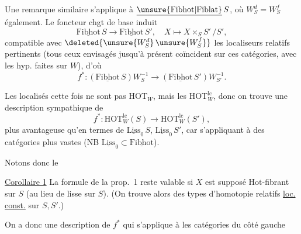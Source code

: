 Une remarque similaire s'applique à $\underline{\unsure{\mathrm{Fibhot}|\mathrm{Fiblat}}}\,S$, où $W_S^d=W_S^f$ également. Le foncteur chgt de base induit
\[
\underline{\mathrm{Fibhot}}\,S\longrightarrow\underline{\mathrm{Fibhot}}\,S',\quad X\longmapsto X\times_S S'\,/S',
\]
compatible avec $\deleted{\unsure{W_S^d}\,\unsure{W_S^f}}$ les localiseurs relatifs pertinents (tous ceux envisagés jusqu'à présent coïncident sur ces catégories, avec les hyp. faites sur $W$), d'où
\[
f^*:(\underline{\mathrm{Fibhot}}\,S)W_S^{-1}\longrightarrow(\underline{\mathrm{Fibhot}}\,S')W_{S'}^{-1}.
\]

Les localisés cette fois ne sont pas  $\mathrm{HOT}_W$, mais les $\mathrm{HOT}^{\mathrm{lc}}_W$, donc on trouve une description sympathique de
\[
f^*:\mathrm{HOT}^{\mathrm{lc}}_W(S)\longrightarrow\mathrm{HOT}^{\mathrm{lc}}_W(S'),
\]
plus avantageuse  qu'en  termes de $\underline{\mathrm{Liss}}_0\,S$, $\underline{\mathrm{Liss}}_0\,S'$, car s'appliquant à des catégories  plus vastes (NB $\underline{\mathrm{Liss}}_0\subset\underline{\mathrm{Fibhot}}$).

Notons donc le

\uline{Corollaire 1} La formule de la prop.~1  reste valable si $X$ est supposé $\mathrm{Hot}$-fibrant sur $S$ (au lieu de lisse sur $S$). (On trouve alors des types d'homotopie relatifs \uline{loc. const.} sur $S,S'$.)

On a donc une description de $f^*$ qui s'applique à  les catégories du côté gauche
